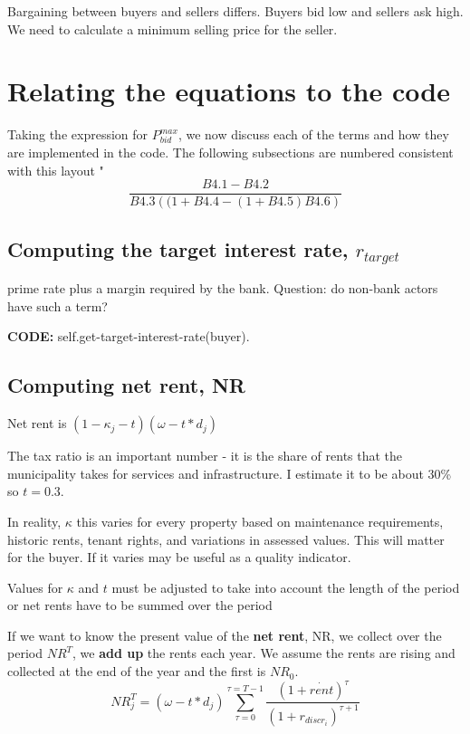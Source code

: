 Bargaining between buyers and sellers differs. Buyers bid low and sellers ask high.  {\color{red}We need to calculate a minimum selling price for the seller}.



\section{Relating the equations to the code}
Taking the expression for $P^{max}_{bid}$, we now discuss each of the terms and how they are implemented in the code. The following subsections are numbered consistent with this layout "
\[\frac{B4.1-B4.2}{B4.3\left( (1+B4.4 - (1+B4.5)B4.6\right)}\]

\subsection{Computing the target interest rate, $r_{target}$}
prime rate plus a margin required by the bank.  Question: do non-bank actors have such a term?

\textbf{CODE:}   self.get-target-interest-rate(buyer).


\subsection{Computing net rent, NR}
Net rent is $(1-\kappa_j - t) (\omega-t*d_j)$


The tax ratio is an important number - it is the share of rents that the municipality takes for services and infrastructure. I estimate it to be about 30\% so $t=0.3$.


In reality, $\kappa$ this varies for every property based on maintenance requirements, historic rents, tenant rights, and variations in assessed values. This will matter for the buyer. If it varies may be useful as a quality indicator.

Values for $\kappa$ and $t$ must be adjusted to take into account the length of the period or net rents have to be summed over the period


If we want to know the  present value  of the \textbf{net rent}, NR, we collect over the period  $NR^T$, we \textbf{add up} the rents each year. We  assume the rents are rising and  collected at the end of the year and the first is $NR_0$.
\[NR_j^T= (\omega-t*d_j)\sum_{\tau=0}^{\tau=T-1} \frac{(1+\dot{rent})^{\tau}} {(1+r_{discr_i})^{\tau+1}} \]

